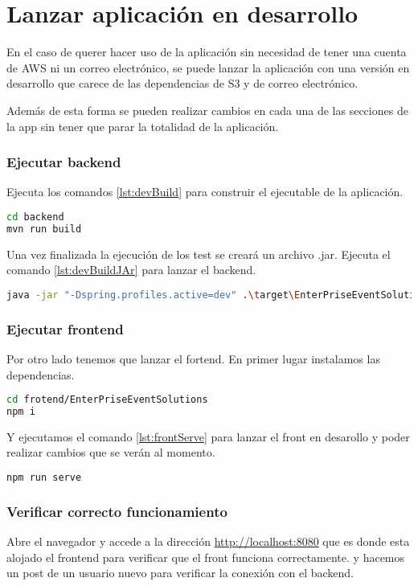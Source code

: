 \section{Lanzar aplicación en desarrollo}
En el caso de querer hacer uso de la aplicación sin necesidad de tener una cuenta de AWS ni un correo electrónico, se puede lanzar la aplicación con una versión en desarrollo que
carece de las dependencias de S3 y de correo electrónico. 

Además de esta forma se pueden realizar cambios en cada una de las secciones de la app sin tener que parar la totalidad de la aplicación. 

\subsubsection{Ejecutar backend}
Ejecuta los comandos \ref{lst:devBuild} para construir el ejecutable de la aplicación.
\begin{lstlisting}[language=Bash, caption=Construir ejecutable, label=lst:devBuild]
cd backend
mvn run build
\end{lstlisting}

Una vez finalizada la ejecución de los test se creará un archivo .jar. Ejecuta el comando \ref{lst:devBuildJAr} para lanzar el backend.
\begin{lstlisting}[language=Bash, caption=Lanzar ejecutable, label=lst:devBuildJAr]
java -jar "-Dspring.profiles.active=dev" .\target\EnterPriseEventSolutions-0.0.1-SNAPSHOT.jar
\end{lstlisting}

\subsubsection{Ejecutar frontend}
Por otro lado tenemos que lanzar el fortend. En primer lugar instalamos las dependencias.
\begin{lstlisting}[language=Bash, caption=Instalar dependencias del frontend, label=lst:frontBuild]
cd frotend/EnterPriseEventSolutions
npm i
\end{lstlisting}

Y ejecutamos el comando \ref{lst:frontServe} para lanzar el front en desarollo y poder realizar cambios que se verán al momento.
\begin{lstlisting}[language=Bash, caption=Lanzar frontend, label=lst:frontServe]
npm run serve
\end{lstlisting}

\subsubsection{Verificar correcto funcionamiento}
Abre el navegador y accede a la dirección \href{http://localhost:8080}{http://localhost:8080} que es donde esta alojado el frontend para verificar que el front funciona correctamente.
y hacemos un post de un usuario nuevo para verificar la conexión con el backend.

